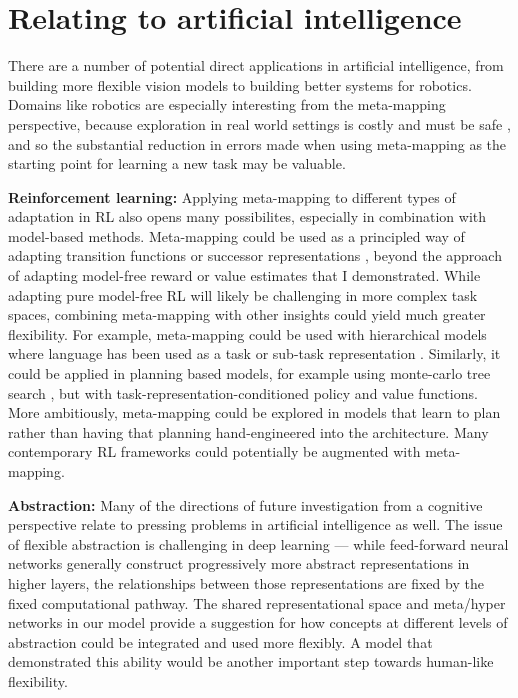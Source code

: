 \section{Relating to artificial intelligence}

There are a number of potential direct applications in artificial intelligence, from building more flexible vision models to building better systems for robotics. Domains like robotics are especially interesting from the meta-mapping perspective, because exploration in real world settings is costly and must be safe \citep{Turchetta2016}, and so the substantial reduction in errors made when using meta-mapping as the starting point for learning a new task may be valuable. \par 

\textbf{Reinforcement learning:} Applying meta-mapping to different types of adaptation in RL also opens many possibilites, especially in combination with model-based methods. Meta-mapping could be used as a principled way of adapting transition functions or successor representations \citep[c.f.][]{Madarasz2019}, beyond the approach of adapting model-free reward or value estimates that I demonstrated. While adapting pure model-free RL will likely be challenging in more complex task spaces, combining meta-mapping with other insights could yield much greater flexibility. For example, meta-mapping could be used with hierarchical models where language has been used as a task or sub-task representation \citep[e.g.][]{Jiang2019}. Similarly, it could be applied in planning based models, for example using monte-carlo tree search \citep[as in e.g.][]{Silver2016, Silver2017}, but with task-representation-conditioned policy and value functions. More ambitiously, meta-mapping could be explored in models that learn to plan \citep{Guez2019} rather than having that planning hand-engineered into the architecture. Many contemporary RL frameworks could potentially be augmented with meta-mapping. \par

\textbf{Abstraction:} Many of the directions of future investigation from a cognitive perspective relate to pressing problems in artificial intelligence as well. The issue of flexible abstraction is challenging in deep learning --- while feed-forward neural networks generally construct progressively more abstract representations in higher layers, the relationships between those representations are fixed by the fixed computational pathway. The shared representational space and meta/hyper networks in our model provide a suggestion for how concepts at different levels of abstraction could be integrated and used more flexibly. A model that demonstrated this ability would be another important step towards human-like flexibility. \par 

